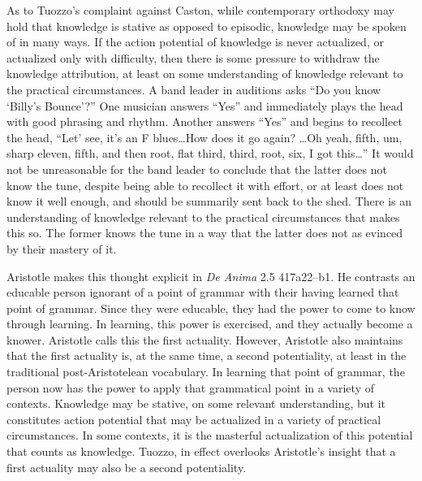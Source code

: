 As to Tuozzo's complaint against Caston, while contemporary orthodoxy may hold that knowledge is stative as opposed to episodic, knowledge may be spoken of in many ways. If the action potential of knowledge is never actualized, or actualized only with difficulty, then there is some pressure to withdraw the knowledge attribution, at least on some understanding of knowledge relevant to the practical circumstances. A band leader in auditions asks ``Do you know `Billy's Bounce'?'' One musician answers ``Yes'' and immediately plays the head with good phrasing and rhythm. Another answers ``Yes'' and begins to recollect the head, ``Let' see, it's an F blues\ldots How does it go again? \ldots Oh yeah, fifth, um, sharp eleven, fifth, and then root, flat third, third, root, six, I got this\ldots'' It would not be unreasonable for the band leader to conclude that the latter does not know the tune, despite being able to recollect it with effort, or at least does not know it well enough, and should be summarily sent back to the shed. There is an understanding of knowledge relevant to the practical circumstances that makes this so. The former knows the tune in a way that the latter does not as evinced by their mastery of it. 

Aristotle makes this thought explicit in \emph{De Anima} 2.5 417a22–b1. He contrasts an educable person ignorant of a point of grammar with their having learned that point of grammar. Since they were educable, they had the power to come to know through learning. In learning, this power is exercised, and they actually become a knower. Aristotle calls this the first actuality. However, Aristotle also maintains that the first actuality is, at the same time, a second potentiality, at least in the traditional post-Aristotelean vocabulary. In learning that point of grammar, the person now has the power to apply that grammatical point in a variety of contexts. Knowledge may be stative, on some relevant understanding, but it constitutes action potential that may be actualized in a variety of practical circumstances. In some contexts, it is the masterful actualization of this potential that counts as knowledge. Tuozzo, in effect overlooks Aristotle's insight that a first actuality may also be a second potentiality.

